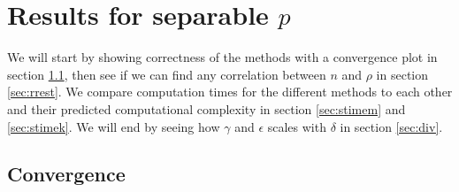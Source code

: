 \chapter{Results for separable $p$}%
We will start by showing correctness of the methods with a convergence plot in section \ref{sec:sconv}, then see if we can find any correlation between $n$ and $\rho$ in section \ref{sec:rrest}.
We compare computation times for the different methods to each other and their predicted computational complexity in section \ref{sec:stimem} and \ref{sec:stimek}.
We will end by seeing how $\gamma$ and $\epsilon$ scales with $\delta$ in section \ref{sec:div}.
\section{Convergence} \label{sec:sconv}



